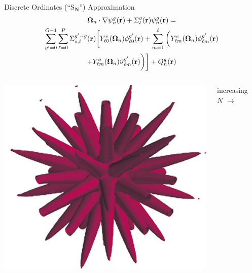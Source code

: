 \documentclass{beamer}
\newcommand{\bo}{\mathbf\Omega}
\newcommand{\vecr}{\textbf{r}}
\newcommand{\sa}{\shortrightarrow}
\newcommand{\Ye}[2]{\ensuremath{Y^e_{#1}(\bo_#2)}}
\newcommand{\Yo}[2]{\ensuremath{Y^o_{#1}(\bo_#2)}}
\begin{document}
\begin{frame}{Discrete Ordinates (``S$_\mathbf{N}$'') Approximation}
%
\vspace{-2em}
%
\begin{multline*}
\bo_n \cdot \nabla \psi_n^g(\vecr) + \Sigma_t^g(\vecr)\psi_n^g(\vecr) = \\
\sum_{g'=0}^{G-1}\sum_{\ell=0}^{P}\Sigma_{s,\ell}^{g'\sa g}(\vecr)
\bigg[\Ye{\ell 0}{n}\phi_{\ell 0}^{g'}(\vecr) + \sum_{m=1}^{\ell}
\bigg(\Ye{\ell m}{n}\phi_{\ell m}^{g'}(\vecr) \\
 + \Yo{\ell m}{n}\vartheta_{\ell m}^{g'}(\vecr)\bigg)\bigg]
+ Q_n^g(\vecr)
\end{multline*}
%
\pause
%
\begin{columns}
\begin{column}{0.4\textwidth}
\includegraphics[width=\textwidth,natwidth=654,natheight=593]{img/ray-effects.png}
\end{column}
\pause
\begin{column}{0.2\textwidth}
\center\large increasing $N$
\vspace{-1.5em}
\center\Huge$\rightarrow$
\end{column}
\begin{column}{0.4\textwidth}

\end{column}
\end{columns}
\end{frame}
\end{document}
